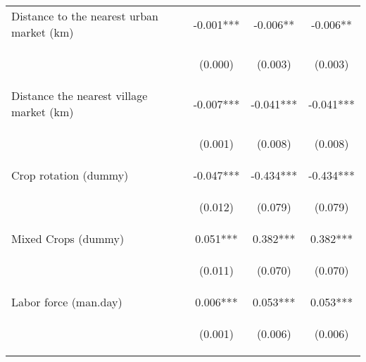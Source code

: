 \begin{center}
\begin{tabular}{lccc}
Distance to the nearest urban market (km) & -0.001*** & -0.006** & -0.006** \\
\vspace{4pt} & \begin{footnotesize}(0.000)\end{footnotesize} & \begin{footnotesize}(0.003)\end{footnotesize} & \begin{footnotesize}(0.003)\end{footnotesize} \\
Distance the nearest village market (km) & -0.007*** & -0.041*** & -0.041*** \\
\vspace{4pt} & \begin{footnotesize}(0.001)\end{footnotesize} & \begin{footnotesize}(0.008)\end{footnotesize} & \begin{footnotesize}(0.008)\end{footnotesize} \\
Crop rotation (dummy) & -0.047*** & -0.434*** & -0.434*** \\
\vspace{4pt} & \begin{footnotesize}(0.012)\end{footnotesize} & \begin{footnotesize}(0.079)\end{footnotesize} & \begin{footnotesize}(0.079)\end{footnotesize} \\
Mixed Crops (dummy) & 0.051*** & 0.382*** & 0.382*** \\
\vspace{4pt} & \begin{footnotesize}(0.011)\end{footnotesize} & \begin{footnotesize}(0.070)\end{footnotesize} & \begin{footnotesize}(0.070)\end{footnotesize} \\
Labor force (man.day) & 0.006*** & 0.053*** & 0.053*** \\
\vspace{4pt} & \begin{footnotesize}(0.001)\end{footnotesize} & \begin{footnotesize}(0.006)\end{footnotesize} & \begin{footnotesize}(0.006)\end{footnotesize} \\

\end{tabular}
\end{center}
